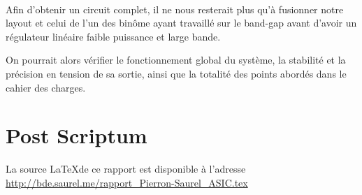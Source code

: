 \documentclass{article}
\begin{document}
~

Afin d’obtenir un circuit complet, il ne nous resterait plus qu’à fusionner notre layout et celui de l’un des binôme ayant travaillé sur le band-gap avant d’avoir un régulateur linéaire faible puissance et large bande.

On pourrait alors vérifier le fonctionnement global du système, la stabilité et la précision en tension de sa sortie, ainsi que la totalité des points abordés dans le cahier des charges.

\section*{Post Scriptum}

La source \LaTeX de ce rapport est disponible à l’adresse \url{http://bde.saurel.me/rapport_Pierron-Saurel_ASIC.tex}
\end{document}
